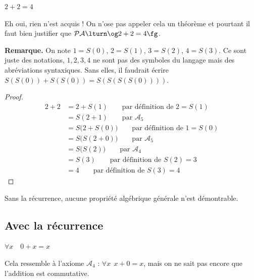 \documentclass[11pt,class=report,crop=false]{standalone}
\begin{document}
\begin{lemme}
	$2+2=4$
\end{lemme}

Eh oui, rien n'est acquis ! On n'ose pas appeler cela un \og{}théorème\fg{} et pourtant il faut bien justifier que $\mathcal{PA} \lturn \text{\og}2+2=4\text{\fg}$.

\textbf{Remarque.} On note $1=S(0)$, $2=S(1)$, $3=S(2)$, $4=S(3)$. Ce sont juste des notations, $1, 2, 3, 4$ ne sont pas des symboles du langage mais des abréviations syntaxiques. Sans elles, il faudrait écrire $S(S(0)) + S(S(0)) = S(S(S(S(0))))$.

\begin{proof}
\begin{align*}
2+2 
	&= 2+S(1) \qquad \text{par définition de } 2=S(1) \\
	&= S(2+1) \qquad \text{par } \mathcal{A}_5 \\
	&= S\big(2+S(0)\big) \qquad \text{par définition de } 1=S(0) \\
	&= S\big(S(2+0)\big) \qquad \text{par } \mathcal{A}_5 \\	
	&= S\big(S(2)\big) \qquad \text{par } \mathcal{A}_4 \\	
	&= S(3) \qquad \text{par définition de } S(2)=3 \\
	&= 4 \qquad \text{par définition de } S(3)=4 	
\end{align*}
\end{proof}

Sans la récurrence, aucune propriété algébrique générale n'est démontrable.

\subsection{Avec la récurrence}

\begin{lemme}
	\label{lem:peano1}
	$\forall x \quad 0+x=x$
\end{lemme}

Cela ressemble à l'axiome $\mathcal{A}_4$ : \og{}$\forall x \ \ x+0=x$\fg{}, mais on ne sait pas encore que l'addition est commutative.
\end{document}
